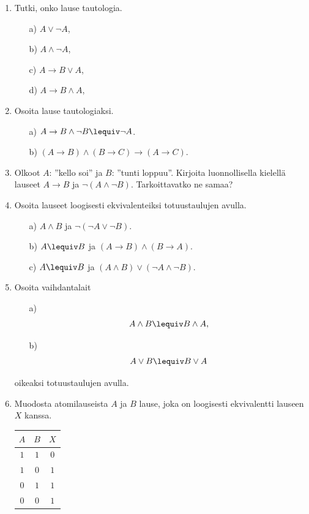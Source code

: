 \begin{enumerate}
\item Tutki, onko lause tautologia.
\begin{itemize}
\item[a)] $A\lor \lnot A$,
\item[b)] $A \land \lnot A$,
\item[c)] $A \to B \lor A$,
\item[d)] $A \to B \land A$,
\end{itemize}

\item Osoita lause tautologiaksi.
\begin{itemize}
\item[a)] $A\to B\land \lnot B \lequiv \lnot A$.
\item[b)] $(A\to B) \land (B\to C)\to (A\to C)$.
\end{itemize}

\item Olkoot $A$: ''kello soi'' ja $B$: ''tunti loppuu''.
Kirjoita luonnollisella kielellä lauseet $A\to B$ ja
$\lnot(A \land \lnot B )$. Tarkoittavatko ne samaa?

\item Osoita lauseet loogisesti ekvivalenteiksi
totuustaulujen avulla.
\begin{itemize}
\item[a)] $A\land B$ ja $\lnot(\lnot A\lor \lnot B )$.
\item[b)] $A\lequiv B$ ja $(A\to B)\land (B \to A)$.
\item[c)] $A\lequiv B$ ja $(A\land B) \lor (\lnot A\land
\lnot B )$.
\end{itemize}

\item Osoita vaihdantalait
\begin{itemize}
\item[a)]
\[
A \land B \lequiv B \land A,
\]
\item[b)]
\[
A \lor B \lequiv B \lor A
\]
\end{itemize}
oikeaksi totuustaulujen avulla.

\item Muodosta atomilauseista $A$ ja $B$ lause, joka on
loogisesti ekvivalentti lauseen $X$ kanssa.
\begin{center}
\begin{tabular}{|c|c|c|}\hline
$A$ & $B$ & $X$\\ \hline
$1$ & $1$ & $0$\\
$1$ & $0$ & $1$\\
$0$ & $1$ & $1$\\
$0$ & $0$ & $1$\\ \hline
\end{tabular}
\end{center}


\end{enumerate}
